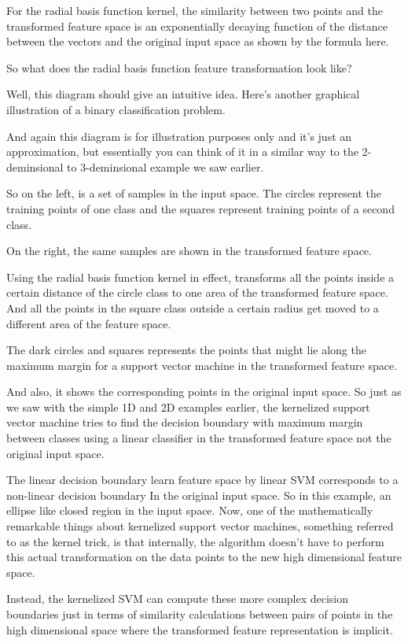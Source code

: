 \begin{multicols}{2}
For the radial basis function kernel, the similarity between two points and the transformed feature space is an exponentially decaying function of the distance between the vectors and the original input space as shown by the formula here. 

So what does the radial basis function feature transformation look like? 

Well, this diagram should give an intuitive idea. Here's another graphical illustration of a binary classification problem. 

And again this diagram is for illustration purposes only and it's just an approximation, but essentially you can think of it in a similar way to the 2-deminsional to 3-deminsional example we saw earlier. 

So on the left, is a set of samples in the input space. The circles represent the training points of one class and the squares represent training points of a second class. 

On the right, the same samples are shown in the transformed feature space. 

Using the radial basis function kernel in effect, transforms all the points inside a certain distance of the circle class to one area of the transformed feature space. And all the points in the square class outside a certain radius get moved to a different area of the feature space. 

The dark circles and squares represents the points that might lie along the maximum margin for a support vector machine in the transformed feature space. 

And also, it shows the corresponding points in the original input space. So just as we saw with the simple 1D and 2D examples earlier, the kernelized support vector machine tries to find the decision boundary with maximum margin between classes using a linear classifier in the transformed feature space not the original input space. 

The linear decision boundary learn feature space by linear SVM corresponds to a non-linear decision boundary In the original input space. So in this example, an ellipse like closed region in the input space. Now, one of the mathematically remarkable things about kernelized support vector machines, something referred to as the kernel trick, is that internally, the algorithm doesn't have to perform this actual transformation on the data points to the new high dimensional feature space. 

Instead, the kernelized SVM can compute these more complex decision boundaries just in terms of similarity calculations between pairs of points in the high dimensional space where the transformed feature representation is implicit. 


\end{multicols}
